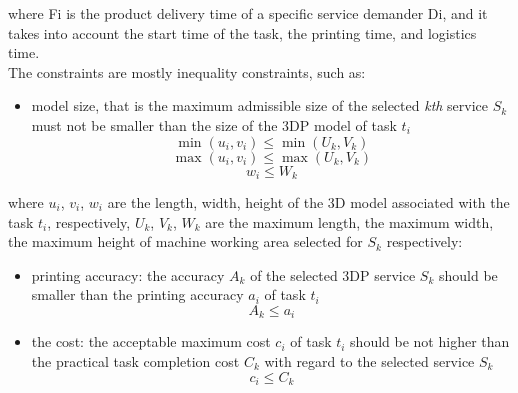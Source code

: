 where Fi is the product delivery time of a specific service demander Di, and it takes into account the start time of the task, the printing time, and logistics time.\\
The constraints are mostly inequality constraints, such as:
\begin{itemize}
    \item model size, that is the maximum admissible size of the selected \emph{kth} service $S_k$ must not be smaller than the size of the 3DP model of task $t_i$ 
    \begin{equation}
        \label{eq:2}
        \min\left(u_i,v_i\right)\leq\min\left(U_k, V_k\right)
    \end{equation}
    \begin{equation}
        \label{eq:3}
        \max\left(u_i,v_i\right)\leq\max\left(U_k, V_k\right)
    \end{equation}
    \begin{equation}
        \label{eq:4}
        w_i \leq W_k
    \end{equation}
\end{itemize}
where $u_i$, $v_i$, $w_i$ are the length, width, height of the 3D model associated with the task $t_i$, respectively, $U_k$, $V_k$, $W_k$ are the maximum length, the maximum width, the maximum height of machine working area selected for $S_k$ respectively:
\begin{itemize}
    \item printing accuracy: the accuracy $A_k$ of the selected 3DP service $S_k$ should be smaller than the printing accuracy $a_i$ of task $t_i$ \begin{equation}\label{eq:5}A_k \leq a_i \end{equation}
    \item the cost: the acceptable maximum cost $c_i$ of task $t_i$ should be not higher than the practical task completion cost $C_k$ with regard to the selected service $S_k$ \begin{equation}\label{eq:6}c_i \leq C_k \end{equation}
\end{itemize}

